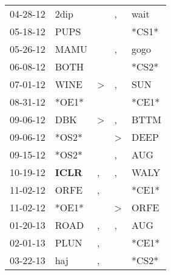 \begin{supertabular}{p{0.07\textwidth}p{0.06\textwidth}p{0.02\textwidth}p{0.02\textwidth}p{0.06\textwidth}}
          04-28-12\textsuperscript{} &           2dip\textsuperscript{} &                  &             , &           wait\textsuperscript{} \\
          05-18-12\textsuperscript{} &           PUPS\textsuperscript{} &                  &               &                            *CS1* \\
          05-26-12\textsuperscript{} &           MAMU\textsuperscript{} &                  &             , &           gogo\textsuperscript{} \\
          06-08-12\textsuperscript{} &           BOTH\textsuperscript{} &                  &               &                            *CS2* \\
          07-01-12\textsuperscript{} &           WINE\textsuperscript{} &     \textgreater &             , &            SUN\textsuperscript{} \\
          08-31-12\textsuperscript{} &                            *OE1* &                  &               &                            *CE1* \\
          09-06-12\textsuperscript{} &            DBK\textsuperscript{} &     \textgreater &             , &           BTTM\textsuperscript{} \\
          09-06-12\textsuperscript{} &                            *OS2* &                  &  \textgreater &           DEEP\textsuperscript{} \\
          09-15-12\textsuperscript{} &                            *OS2* &                  &             , &            AUG\textsuperscript{} \\
          10-19-12\textsuperscript{} &  \textbf{ICLR\textsuperscript{}} &                , &             , &           WALY\textsuperscript{} \\
          11-02-12\textsuperscript{} &           ORFE\textsuperscript{} &                , &               &                            *CE1* \\
          11-02-12\textsuperscript{} &                            *OE1* &                  &  \textgreater &           ORFE\textsuperscript{} \\
          01-20-13\textsuperscript{} &           ROAD\textsuperscript{} &                , &             , &            AUG\textsuperscript{} \\
          02-01-13\textsuperscript{} &           PLUN\textsuperscript{} &                , &               &                            *CE1* \\
          03-22-13\textsuperscript{} &            haj\textsuperscript{} &                , &               &                            *CS2* \\

\end{supertabular}
